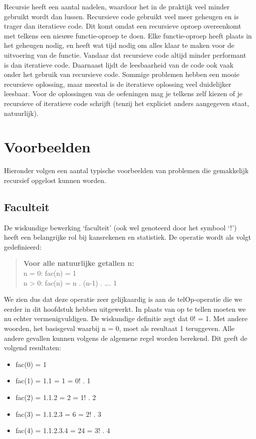 Recursie heeft een aantal nadelen, waardoor het in de praktijk veel minder gebruikt wordt dan lussen. Recursieve code gebruikt veel meer geheugen en is trager dan iteratieve code. Dit komt omdat een recursieve oproep overeenkomt met telkens een nieuwe functie-oproep te doen. Elke functie-oproep heeft plaats in het geheugen nodig, en heeft wat tijd nodig om alles klaar te maken voor de uitvoering van de functie. Vandaar dat recursieve code altijd minder performant is dan iteratieve code. Daarnaast lijdt de leesbaarheid van de code ook vaak onder het gebruik van recursieve code. Sommige problemen hebben een mooie recursieve oplossing, maar meestal is de iteratieve oplossing veel duidelijker leesbaar. Voor de oplossingen van de oefeningen mag je telkens zelf kiezen of je recursieve of iteratieve code schrijft (tenzij het expliciet anders aangegeven staat, natuurlijk).

\section{Voorbeelden}

Hieronder volgen een aantal typische voorbeelden van problemen die gemakkelijk recursief opgelost kunnen worden.

\subsection{Faculteit}

De wiskundige bewerking `faculteit' (ook wel genoteerd door het symbool `!') heeft een belangrijke rol bij kansrekenen en statistiek. De operatie wordt als volgt gedefinieerd:

\begin{quote}
\textbf{Voor alle natuurlijke getallen n:} \\
n = 0:  fac(n) = 1 \\
n > 0:  fac(n) = n . (n-1) . \ldots . 1
\end{quote}

We zien dus dat deze operatie zeer gelijkaardig is aan de telOp-operatie die we eerder in dit hoofdstuk hebben uitgewerkt. In plaats van op te tellen moeten we nu echter vermenigvuldigen. De wiskundige definitie zegt dat 0! = 1. Met andere woorden, het basisgeval waarbij n = 0, moet als resultaat 1 teruggeven. Alle andere gevallen kunnen volgens de algemene regel worden berekend. Dit geeft de volgend resultaten:

\begin{itemize}
\item[] fac(0) = 1
\item[] fac(1) = 1.1 = 1        = 0! . 1
\item[] fac(2) = 1.1.2 = 2        = 1! . 2
\item[] fac(3) = 1.1.2.3 = 6        = 2! . 3
\item[] fac(4) = 1.1.2.3.4 = 24    = 3! . 4
\end{itemize}

